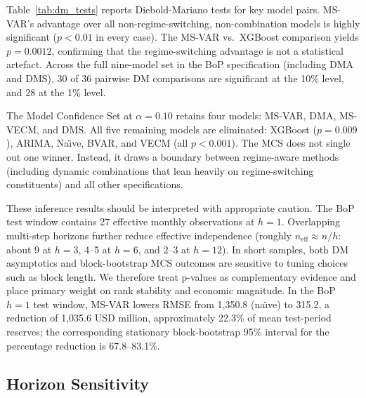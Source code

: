 \documentclass[12pt,a4paper]{article}
\begin{document}
Table~\ref{tab:dm_tests} reports Diebold-Mariano tests for key model pairs. MS-VAR's advantage over all non-regime-switching, non-combination models is highly significant ($p < 0.01$ in every case). The MS-VAR vs.\ XGBoost comparison yields $p = 0.0012$, confirming that the regime-switching advantage is not a statistical artefact. Across the full nine-model set in the BoP specification (including DMA and DMS), 30 of 36 pairwise DM comparisons are significant at the 10\% level, and 28 at the 1\% level.

The Model Confidence Set at $\alpha = 0.10$ retains four models: MS-VAR, DMA, MS-VECM, and DMS. All five remaining models are eliminated: XGBoost ($p = 0.009$), ARIMA, Na\"{\i}ve, BVAR, and VECM (all $p < 0.001$). The MCS does not single out one winner. Instead, it draws a boundary between regime-aware methods (including dynamic combinations that lean heavily on regime-switching constituents) and all other specifications.

These inference results should be interpreted with appropriate caution. The BoP test window contains 27 effective monthly observations at $h=1$. Overlapping multi-step horizons further reduce effective independence (roughly $n_{\text{eff}} \approx n/h$: about 9 at $h=3$, 4--5 at $h=6$, and 2--3 at $h=12$). In short samples, both DM asymptotics and block-bootstrap MCS outcomes are sensitive to tuning choices such as block length. We therefore treat p-values as complementary evidence and place primary weight on rank stability and economic magnitude. In the BoP $h=1$ test window, MS-VAR lowers RMSE from 1,350.8 (na\"{\i}ve) to 315.2, a reduction of 1,035.6 USD million, approximately 22.3\% of mean test-period reserves; the corresponding stationary block-bootstrap 95\% interval for the percentage reduction is 67.8--83.1\%.

\subsection{Horizon Sensitivity}
\end{document}
